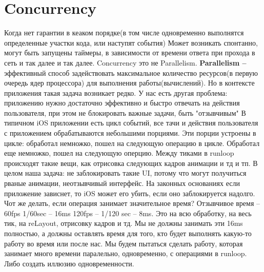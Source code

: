 \documentclass{article}
\begin{document}
    \section{Concurrency}
    Когда нет гарантии в кеаком порядке(в том числе одновременно выполнятся определенные участки кода, или наступят события)
    \newline
    Может возникать спонтанно, могут быть запущены таймеры, в зависимости от времени ответа при прохода в сеть и так далее и так далее. 
    \newline
    Concurrency это не Parallelism. \textbf{Parallelism -- } эффективный способ задействовать максимальное количество ресурсов(в первую очередь ядер процессора) для выполнения работы(вычислений). 
    \newline
    Но в контексте приложения такая задача возникает редко. 
    \newline
    У нас есть другая проблема: приложению нужно достаточно эффективно и быстро отвечать на действия пользователя, при этом не блокировать важные задачи, быть "отзывчивым"
    \newline
    \newline
    В типичном iOS приложении есть цикл событий, все тачи и действия пользователя с приложением обрабатываются небольшими порциями. Эти порции устроены в цикле: обработал немножко, пошел на следующую операцию в цикле. Обработал еще немножко, пошел на следующую оперцию. Между тиками в runloop происходят такие вещи, как отрисовка следующих кадров анимации и тд и тп. 
    \newline
    В целом наша задача: не заблокировать такие UI, потому что могут получиться рваные анимации, неотзывчивый интерфейс. На законных основаниях если приложение зависнет, то iOS может его убить, если оно заблокируется надолго. Чот же делать, если операция занимает значительное время? 
    \newline
    Отзывчивое время -- 60fps 1/60sec -- 16ms
    \newline
    120fps -- 1/120 sec -- 8ms.
    \newline
    Это на всю обработку, на весь тик, на reLayout, отрисовку кадров и тд. Мы не должны занимать эти 16ms полностью, а должны оставлять время для того, кто будет выполнять какую-то работу во время или после нас. 
    \newline
    Мы будем пытаться сделать работу, которая занимает много времени паралельно, одновременно, с операциями в runloop. Либо создать иллюзию одновременности. 
\end{document}
